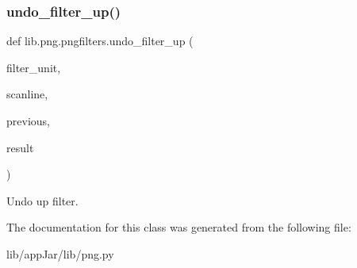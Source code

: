 \subsubsection{\texorpdfstring{undo\+\_\+filter\+\_\+up()}{undo\_filter\_up()}}
{\footnotesize\ttfamily def lib.\+png.\+pngfilters.\+undo\+\_\+filter\+\_\+up (\begin{DoxyParamCaption}\item[{}]{filter\+\_\+unit,  }\item[{}]{scanline,  }\item[{}]{previous,  }\item[{}]{result }\end{DoxyParamCaption})}

\begin{DoxyVerb}Undo up filter.\end{DoxyVerb}
 

The documentation for this class was generated from the following file\+:\begin{DoxyCompactItemize}
\item 
lib/app\+Jar/lib/png.\+py\end{DoxyCompactItemize}
